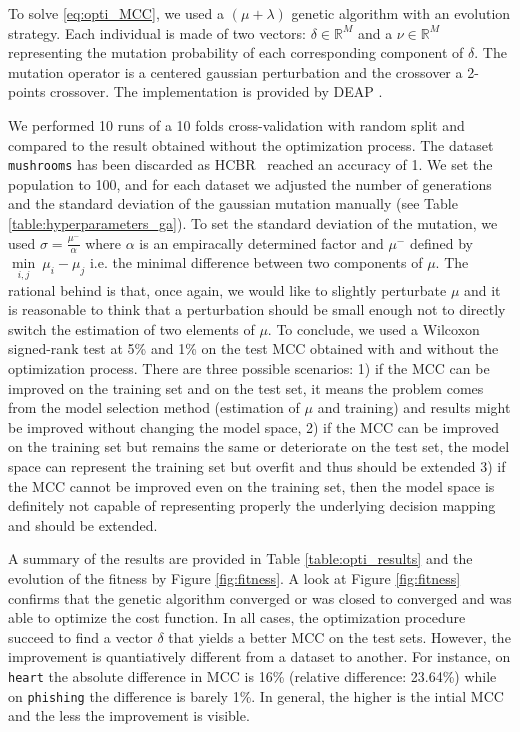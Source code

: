 \documentclass[preprint,12pt]{elsarticle}
\def\HCBR{{\sc HCBR}}
\theoremstyle{definition}
\begin{document}
To solve \eqref{eq:opti_MCC}, we used a $(\mu+\lambda)$ genetic algorithm with an evolution strategy. Each individual is made of two vectors: $\delta \in \mathbb{R}^M$ and a $\nu \in \mathbb{R}^M$ representing the mutation probability of each corresponding component of $\delta$. The mutation operator is a centered gaussian perturbation and the crossover a 2-points crossover. The implementation is provided by DEAP \cite{DEAP_JMLR2012}.


We performed 10 runs of a 10 folds cross-validation with random split and compared to the result obtained without the optimization process. The dataset \texttt{mushrooms} has been discarded as \HCBR~ reached an accuracy of 1. We set the population to 100, and for each dataset we adjusted the number of generations and the standard deviation of the gaussian mutation manually (see Table \ref{table:hyperparameters_ga}). To set the standard deviation of the mutation, we used $\sigma = \frac{\mu^-}{\alpha}$ where $\alpha$ is an empiracally determined factor and $\mu^-$ defined by $\underset{i,j}{\min}{~ \mu_i - \mu_j}$ i.e. the minimal difference between two components of $\mu$. The rational behind is that, once again, we would like to slightly perturbate $\mu$ and it is reasonable to think that a perturbation should be small enough not to directly switch the estimation of two elements of $\mu$. To conclude, we used a Wilcoxon signed-rank test at 5\% and 1\% on the test MCC obtained with and without the optimization process. There are three possible scenarios: 1) if the MCC can be improved on the training set and on the test set, it means the problem comes from the model selection method (estimation of $\mu$ and training) and results might be improved without changing the model space, 2) if the MCC can be improved on the training set but remains the same or deteriorate on the test set, the model space can represent the training set but overfit and thus should be extended 3) if the MCC cannot be improved even on the training set, then the model space is definitely not capable of representing properly the underlying decision mapping and should be extended.


A summary of the results are provided in Table \ref{table:opti_results} and the evolution of the fitness by Figure \ref{fig:fitness}. A look at Figure \ref{fig:fitness} confirms that the genetic algorithm converged or was closed to converged and was able to optimize the cost function. In all cases, the optimization procedure succeed to find a vector $\delta$ that yields a better MCC on the test sets. However, the improvement is quantiatively different from a dataset to another. For instance, on \texttt{heart} the absolute difference in MCC is 16\% (relative difference: 23.64\%) while on \texttt{phishing} the difference is barely 1\%. In general, the higher is the intial MCC and the less the improvement is visible. 
\end{document}
